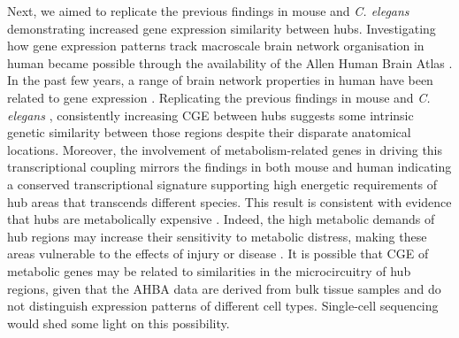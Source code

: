 Next, we aimed to replicate the previous findings in mouse \citep{Fulcher2016} and \textit{C. elegans} \citep{Arnatkeviciute2018} demonstrating increased gene expression similarity between hubs. Investigating how gene expression patterns track macroscale brain network organisation in human became possible through the availability of the Allen Human Brain Atlas \citep{Hawrylycz2012}. In the past few years, a range of brain network properties in human have been related to gene expression \citep{Cioli2014b,Forest2017,Goel2014,Richiardi2015,Vertes2016b}. Replicating the previous findings in mouse \citep{Fulcher2016} and \textit{C. elegans} \citep{Arnatkeviciute2018}, consistently increasing CGE between hubs suggests some intrinsic genetic similarity between those regions despite their disparate anatomical locations. Moreover, the involvement of metabolism-related genes in driving this transcriptional coupling mirrors the findings in both mouse \citep{Fulcher2016} and human \citep{Vertes2016b} indicating a conserved transcriptional signature supporting high energetic requirements of hub areas \citep{Liang2013a,Tomasi2013} that transcends different species. This result is consistent with evidence that hubs are metabolically expensive \citep{Vaishnavi2010,Varkuti2011}. Indeed, the high metabolic demands of hub regions may increase their sensitivity to metabolic distress, making these areas vulnerable to the effects of injury or disease \citep{Crossley2014,Fornito2015}. It is possible that CGE of metabolic genes may be related to similarities in the microcircuitry of hub regions, given that the AHBA data are derived from bulk tissue samples and do not distinguish expression patterns of different cell types. Single-cell sequencing \citep{Lein2017} would shed some light on this possibility.
 
